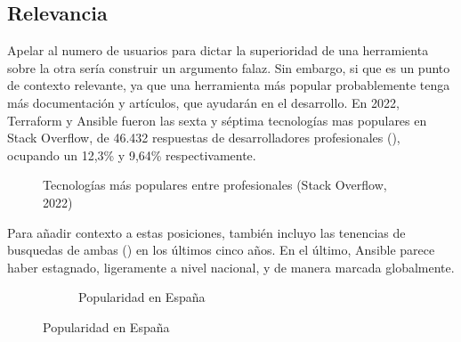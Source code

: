 \documentclass[11pt]{article}
\begin{document}
\begin{flushleft}
\subsection{Relevancia}
Apelar al numero de usuarios para dictar la superioridad de una herramienta sobre la otra sería construir un argumento falaz. Sin embargo, si que es un punto de contexto relevante, ya que una herramienta más popular probablemente tenga más documentación y artículos, que ayudarán en el desarrollo. En 2022, Terraform y Ansible fueron las sexta y séptima tecnologías mas populares en Stack Overflow, de 46.432 respuestas de desarrolladores profesionales (\cite{stack_overflow_pop}), ocupando un 12,3\% y 9,64\% respectivamente.
\linebreak

    \begin{figure}[htb]
        \centering
        \caption{Tecnologías más populares entre profesionales (Stack Overflow, 2022)}
    \end{figure}

Para añadir contexto a estas posiciones, también incluyo las tenencias de busquedas de ambas (\cite{google_pop}) en los últimos cinco años. En el último, Ansible parece haber estagnado, ligeramente a nivel nacional, y de manera marcada globalmente. 
\linebreak
    \begin{figure}[htb]
        \centering
        \begin{subfigure}{0.95\textwidth}
            \caption{Popularidad en España}
        \end{subfigure}
        \linebreak
     \end{figure} 
     

\end{flushleft}
\end{document}
